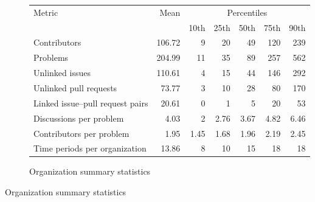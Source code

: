 \begin{figure}[ht]

    \caption{Descriptive statistics of key organization metrics} \label{fig:summary-stats}
  
  \centering
  \medskip

\begin{subfigure}[b]{0.9\textwidth}
  \centering
  \footnotesize
  \caption{Organization summary statistics}
  \label{fig:organization-summary-stats}
  \begin{tabular}{@{}l r *{5}{r}@{}}
    \toprule
    Metric                        & Mean   & \multicolumn{5}{c}{Percentiles} \\
    \cmidrule(lr){3-7}
                                  &        & 10th   & 25th   & 50th   & 75th   & 90th   \\
    \midrule
    Contributors                   & 106.72 & 9      & 20     & 49     & 120    & 239    \\
    Problems                       & 204.99 & 11     & 35     & 89     & 257    & 562    \\
    Unlinked issues                & 110.61 & 4      & 15     & 44     & 146    & 292    \\
    Unlinked pull requests         & 73.77  & 3      & 10     & 28     & 80     & 170    \\
    Linked issue–pull request pairs & 20.61  & 0      & 1      & 5      & 20     & 53     \\
    Discussions per problem        & 4.03   & 2      & 2.76   & 3.67   & 4.82   & 6.46   \\
    Contributors per problem       & 1.95   & 1.45   & 1.68   & 1.96   & 2.19   & 2.45   \\
    Time periods per organization       & 13.86  & 8      & 10     & 15     & 18     & 18     \\
    \bottomrule
  \end{tabular}
\end{subfigure}

  \bigskip


\end{figure}

